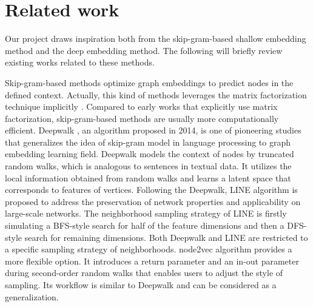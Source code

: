 \documentclass[sigconf]{acmart}
\begin{document}
\section{Related work}
Our project draws inspiration both from the skip-gram-based shallow embedding method and the deep embedding method. The following will briefly review existing works related to these methods.\par

Skip-gram-based methods optimize graph embeddings to predict nodes in the defined context. Actually, this kind of methods leverages the matrix factorization technique implicitly \cite{murphy2022}. Compared to early works that explicitly use matrix factorization, skip-gram-based methods are usually more computationally efficient. Deepwalk \cite{deepwalk}, an algorithm proposed in 2014, is one of pioneering studies that generalizes the idea of skip-gram model in language processing to graph embedding learning field. Deepwalk models the context of nodes by truncated random walks, which is analogous to sentences in textual data. It utilizes the local information obtained from random walks and learns a latent space that corresponds to features of vertices. Following the Deepwalk, LINE algorithm \cite{line} is proposed to address the preservation of network properties and applicability on large-scale networks. The neighborhood sampling strategy of LINE is firstly simulating a BFS-style search for half of the feature dimensions and then a DFS-style search for remaining dimensions. Both Deepwalk and LINE are restricted to a specific sampling strategy of neighborhoods. node2vec \cite{node2vec} algorithm provides a more flexible option. It introduces a return parameter and an in-out parameter during second-order random walks that enables users to adjust the style of sampling. Its workflow is similar to Deepwalk and can be considered as a generalization.\par
\end{document}
